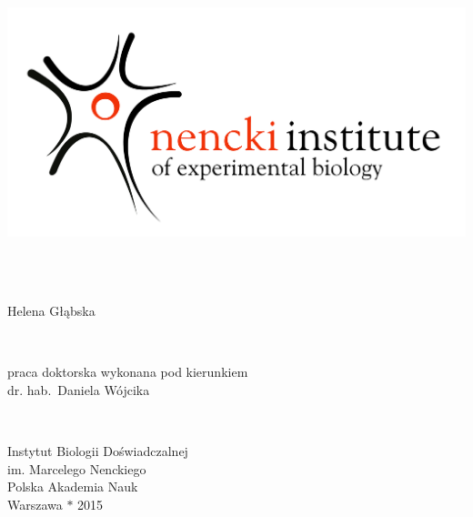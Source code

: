 \documentclass[a4paper,12pt,polish]{book}
\begin{document}
\onehalfspacing
\thispagestyle{empty}

 
\begin{center}
  
   \ \\
 

\includegraphics{../ryciny/nencki.png}
\vfill

   \begin{doublespace}
     \hspace*{-4ex}\begin{minipage}[l]{1.1\textwidth}
       \begin{center}
         {\sc\LARGE  

	\\


      }\\[1em]
         {\large\sc Helena Głąbska}
       \end{center}

     \end{minipage}
   \end{doublespace}

   \vfill
\
 \vfill
  {%
  \begin{minipage}[c]{0.75\textwidth}
    \centering
    {\sc praca doktorska wykonana pod kierunkiem} \\
    {\sc dr. hab.\ Daniela Wójcika}\\
  \end{minipage}} \\
  \vfill  

  {\sc Instytut Biologii Doświadczalnej} \\
  {\sc im. Marcelego Nenckiego}\\
  {\sc Polska Akademia Nauk}\\[1em]
  {\sc Warszawa $\ast$ 2015}
\end{center}
\end{document}
